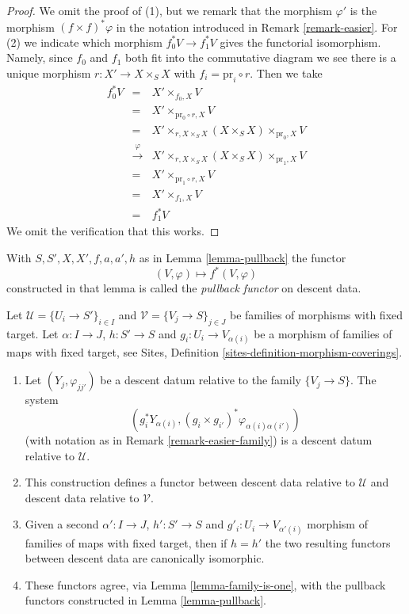 \begin{proof}
We omit the proof of (1), but we remark that the morphism
$\varphi'$ is the morphism $(f \times f)^*\varphi$ in the
notation introduced in Remark \ref{remark-easier}.
For (2) we indicate which morphism
$f_0^*V \to f_1^*V$ gives the functorial isomorphism. Namely,
since $f_0$ and $f_1$ both fit into the commutative diagram
we see there is a unique morphism $r : X' \to X \times_S X$
with $f_i = \text{pr}_i \circ r$. Then we take
\begin{eqnarray*}
f_0^*V & = &
X' \times_{f_0, X} V \\
& = &
X' \times_{\text{pr}_0 \circ r, X} V \\
& = &
X' \times_{r, X \times_S X} (X \times_S X) \times_{\text{pr}_0, X} V \\
& \xrightarrow{\varphi} &
X' \times_{r, X \times_S X} (X \times_S X) \times_{\text{pr}_1, X} V \\
& = &
X' \times_{\text{pr}_1 \circ r, X} V \\
& = &
X' \times_{f_1, X} V \\
& = & f_1^*V
\end{eqnarray*}
We omit the verification that this works.
\end{proof}

\begin{definition}
\label{definition-pullback-functor}
With $S, S', X, X', f, a, a', h$ as in Lemma \ref{lemma-pullback} the functor
$$
(V, \varphi) \longmapsto f^*(V, \varphi)
$$
constructed in that lemma is called the {\it pullback functor} on descent data.
\end{definition}

\begin{lemma}
\label{lemma-pullback-family}
Let $\mathcal{U} = \{U_i \to S'\}_{i \in I}$ and
$\mathcal{V} = \{V_j \to S\}_{j \in J}$ be families of morphisms with
fixed target. Let $\alpha : I \to J$, $h : S' \to S$ and
$g_i : U_i \to V_{\alpha(i)}$ be a morphism of families
of maps with fixed target, see
Sites, Definition \ref{sites-definition-morphism-coverings}.
\begin{enumerate}
\item Let $(Y_j, \varphi_{jj'})$ be a descent datum relative to the
family $\{V_j \to S\}$. The system
$$
\left(
g_i^*Y_{\alpha(i)},
(g_i \times g_{i'})^*\varphi_{\alpha(i)\alpha(i')}
\right)
$$
(with notation as in Remark \ref{remark-easier-family})
is a descent datum relative to $\mathcal{U}$.
\item This construction defines a functor between descent data relative
to $\mathcal{U}$ and descent data relative to $\mathcal{V}$.
\item Given a second $\alpha' : I \to J$, $h' : S' \to S$ and
$g'_i : U_i \to V_{\alpha'(i)}$ morphism of families
of maps with fixed target, then if $h = h'$ the two resulting functors
between descent data are canonically isomorphic.
\item These functors agree, via Lemma \ref{lemma-family-is-one},
with the pullback functors constructed in Lemma \ref{lemma-pullback}.
\end{enumerate}
\end{lemma}

